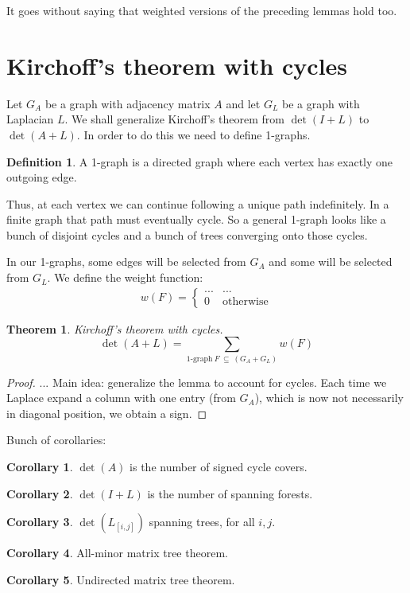 \documentclass[a4paper, 11pt]{article}
\newtheorem{theorem}{Theorem}[section]
\theoremstyle{definition}
\newtheorem{definition}{Definition}[section]
\newtheorem{corollary}{Corollary}[theorem]
\begin{document}
It goes without saying that weighted versions of the preceding lemmas hold too.

\section{Kirchoff's theorem with cycles}

Let $G_A$ be a graph with adjacency matrix $A$ and let $G_L$ be a graph with Laplacian $L$. We shall generalize Kirchoff's theorem from $\det(I + L)$ to $\det(A + L)$. In order to do this we need to define 1-graphs.

\begin{definition}
  A 1-graph is a directed graph where each vertex has exactly one outgoing edge.
\end{definition}

Thus, at each vertex we can continue following a unique path indefinitely. In a finite graph that path must eventually cycle. So a general 1-graph looks like a bunch of disjoint cycles and a bunch of trees converging onto those cycles.

In our 1-graphs, some edges will be selected from $G_A$ and some will be selected from $G_L$. We define the weight function:
\begin{align*}
  w(F) = \begin{cases}
    ... & ... \\
    0 & \text{otherwise}
  \end{cases}
\end{align*}

\begin{theorem} Kirchoff's theorem with cycles.
  \[
    \det(A + L) = \sum_{\text{1-graph}\ F\ \subseteq\ (G_A + G_L)} w(F)
  \]
\end{theorem}
\begin{proof}
  ... Main idea: generalize the lemma to account for cycles. Each time we Laplace expand a column with one entry (from $G_A$), which is now not necessarily in diagonal position, we obtain a sign.
\end{proof}

Bunch of corollaries:

\begin{corollary}
  $\det(A)$ is the number of signed cycle covers.
\end{corollary}

\begin{corollary}
  $\det(I + L)$ is the number of spanning forests.
\end{corollary}

\begin{corollary}
  $\det(L_{[i,j]})$ spanning trees, for all $i,j$.
\end{corollary}

\begin{corollary}
  All-minor matrix tree theorem.
\end{corollary}

\begin{corollary}
  Undirected matrix tree theorem.
\end{corollary}
\end{document}
